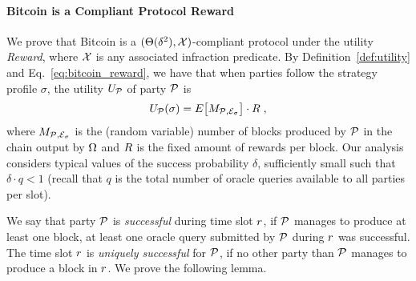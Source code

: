 \paragraph{Bitcoin is a Compliant Protocol \wrt Reward}
We prove that Bitcoin is a $(\Theta(\delta^2), \mathcal{X})$-compliant
protocol under the utility \emph{Reward}, where $\mathcal{X}$ is any
associated infraction predicate. By Definition~\ref{def:utility} and
Eq.~\eqref{eq:bitcoin_reward}, we have that when parties follow the strategy
profile $\sigma$, the utility $U_{\mathcal{P}}$ of party $\mathcal{P}$ is
\begin{equation}\label{eq:bitcoin_utility}
    U_{\mathcal{P}}(\sigma)=E\big[M_{\mathcal{P},\mathcal{E}_\sigma}\big]\cdot R\;,
\end{equation}
where $M_{\mathcal{P},\mathcal{E}_\sigma}$ is the (random variable)
number of blocks produced by $\mathcal{P}$ in the chain output by $\Omega$ and
$R$ is the fixed amount of rewards per block. Our analysis considers
typical values of the success probability $\delta$, sufficiently small such
that $\delta\cdot q < 1$ (recall that $q$ is the total number of oracle queries
available to all parties per slot).

We say that party $\mathcal{P}$ is \emph{successful} during time slot $r$, if
$\mathcal{P}$ manages to produce at least one block, \ie at least one oracle query
submitted by $\mathcal{P}$ during $r$ was successful. The time slot $r$ is
\emph{uniquely successful} for $\mathcal{P}$, if no other party than $\mathcal{P}$
manages to produce a block in $r$. We prove the following lemma.

